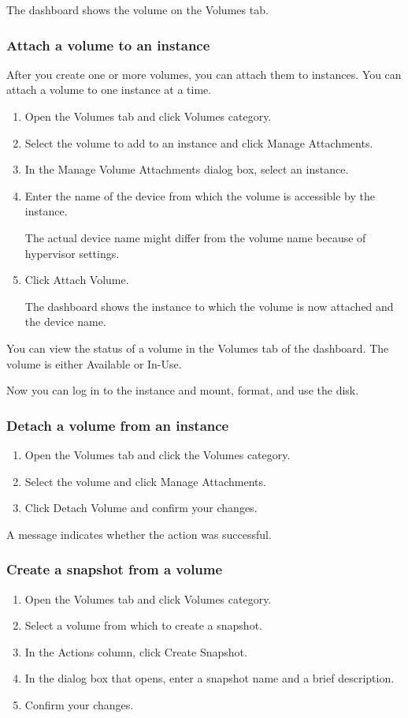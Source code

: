 The dashboard shows the volume on the Volumes tab.

\subsubsection{Attach a volume to an
  instance}\label{attach-a-volume-to-an-instance}
After you create one or more volumes, you can attach them to
instances.  You can attach a volume to one instance at a time.

\begin{enumerate}
\item Open the Volumes tab and click Volumes
  category.
\item Select the volume to add to an instance and click Manage
  Attachments.
\item In the Manage Volume Attachments dialog box, select an instance.
\item Enter the name of the device from which the volume is accessible
  by the instance.

   The actual device name might differ from the volume
  name because of hypervisor settings.
\item Click Attach Volume.

  The dashboard shows the instance to which the volume is now attached
  and the device name.
\end{enumerate}
You can view the status of a volume in the Volumes tab of the dashboard.
The volume is either Available or In-Use.

Now you can log in to the instance and mount, format, and use the disk.

\subsubsection{Detach a volume from an instance}\label{detach-a-volume-from-an-instance}
\begin{enumerate}
\item Open the Volumes tab and click the Volumes
  category.
  \item Select the volume and click Manage Attachments.
  \item Click Detach Volume and confirm your changes.
  \end{enumerate}

A message indicates whether the action was successful.

\subsubsection{Create a snapshot from a
  volume}\label{create-a-snapshot-from-a-volume}
\begin{enumerate}
\item Open the Volumes tab and click Volumes category.
\item Select a volume from which to create a snapshot.
\item In the Actions column, click Create Snapshot.
\item In the dialog box that opens, enter a snapshot name and a brief
  description.
\item Confirm your changes.
\end{enumerate}

